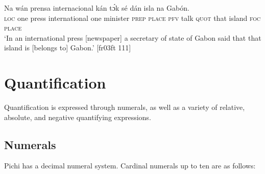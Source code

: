 \ea%
    \label{ex:key:249}
    \gll Na  wán  prensa  internacional            
kán  tɔ́k  sé    dán    isla    na  Gabón.\\
\textsc{loc}  one  press  international    one    minister    \textsc{prep}  \textsc{place}
\textsc{pfv}  talk  \textsc{quot}    that    island  \textsc{foc}  \textsc{place}\\

\glt ‘In an international press [newspaper] a secretary of state of Gabon said that that island is [belongs to] Gabon.’ [fr03ft 111]
\z

\section{Quantification}\label{sec:5.3}

Quantification is expressed through numerals, as well as a variety of relative, absolute, and negative quantifying expressions.

\subsection{Numerals}\label{sec:5.3.1}

Pichi has a decimal numeral system. Cardinal numerals up to ten are as follows:

